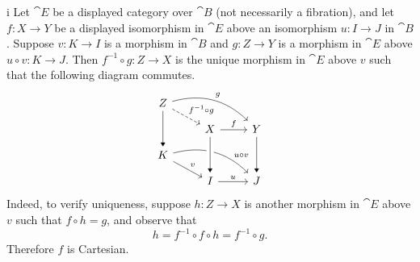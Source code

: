 \begin{partsolution}{i}
Let \(\cat{E}\) be a displayed category over \(\cat{B}\) (not necessarily a fibration), and let \(f : X \to Y\) be a displayed isomorphism in \(\cat{E}\) above an isomorphism \(u : I \to J\) in \(\cat{B}\).
Suppose \(v : K \to I\) is a morphism in \(\cat{B}\) and \(g : Z \to Y\) is a morphism in \(\cat{E}\) above \(u \circ v : K \to J\). Then \(f^{-1} \circ g : Z \to X\) is the unique morphism in \(\cat{E}\) above \(v\) such that the following diagram commutes.
\begin{equation*}
\begin{tikzcd}[row sep=small]
Z \arrow[rd, dashed, "f^{-1} \circ g"] \arrow[rrd, bend left, "g"] \arrow[dd, -Triangle] \\
& X \arrow[r, "f"] & Y \arrow[dd, -Triangle] \\
K \arrow[rd, "v"] \arrow[rrd, bend left, near end, "u \circ v"] \\
& I \arrow[r, "u"] & J
\arrow[from=uul, to=l, -Triangle, crossing over]
\end{tikzcd}
\end{equation*}
Indeed, to verify uniqueness, suppose \(h : Z \to X\) is another morphism in \(\cat{E}\) above \(v\) such that \(f \circ h = g\), and observe that
\begin{equation*}
h = f^{-1} \circ f \circ h = f^{-1} \circ g.
\end{equation*}
Therefore \(f\) is Cartesian.
\end{partsolution}

